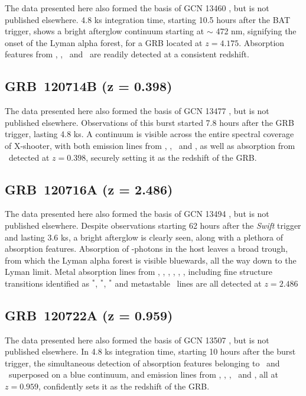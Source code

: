 \documentclass{aa}    %
\begin{document}
The data presented here also formed the basis of GCN 13460 \citep{GCN13460}, but
is not published elsewhere. 4.8 ks integration time, starting 10.5 hours after
the BAT trigger, shows a bright afterglow continuum starting at $\sim$ 472 nm,
signifying the onset of the Lyman alpha forest, for a GRB located at $z =
4.175$. Absorption features from \lya, \feii, \mgii~and \SIii~are readily
detected at a consistent redshift.

\subsection{GRB~120714B (z = 0.398)} \label{120714}

The data presented here also formed the basis of GCN 13477 \citep{GCN13477}, but
is not published elsewhere. Observations of this burst started 7.8 hours after
the GRB trigger, lasting 4.8 ks. A continuum is visible across the entire
spectral coverage of X-shooter, with both emission lines from  \oii, \hb,
\oiii~and \ha, as well as absorption from \mgii~detected at $z = 0.398$,
securely setting it as the redshift of the GRB.


\subsection{GRB~120716A (z = 2.486)} \label{120716}

The data presented here also formed the basis of GCN 13494 \citep{GCN13494}, but
is not published elsewhere. Despite observations starting 62 hours after the
\textit{Swift} trigger and lasting 3.6 ks, a bright afterglow is clearly seen,
along with a plethora of absorption features. Absorption of \lya-photons in the
host leaves a broad trough, from which the Lyman alpha forest is visible
bluewards, all the way down to the Lyman limit. Metal absorption lines from
\cii, \SIii, \oi, \feii, \civ, \SIiv, including fine structure transitions
identified as \cii$^*$, \SIii$^*$, \feii$^*$ and metastable \NIii~lines are all
detected at $z = 2.486$


\subsection{GRB~120722A (z = 0.959)} \label{120722}

The data presented here also formed the basis of GCN 13507 \citep{GCN13507}, but
is not published elsewhere. In 4.8 ks integration time, starting 10 hours after
the burst trigger, the simultaneous detection of absorption features belonging
to \mgii~and \feii~superposed on a blue continuum, and emission lines from \oii,
\hg, \hb, \oiii~and \ha, all at $z = 0.959$, confidently sets it as the redshift
of the GRB.
\end{document}
